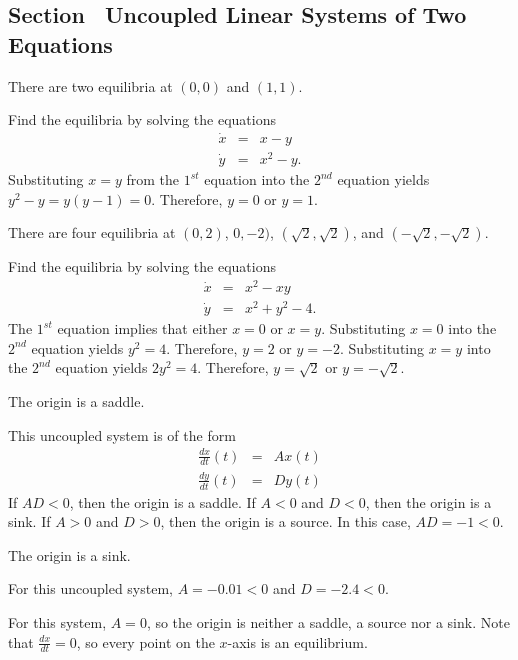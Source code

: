 \subsection*{Section~\protect{\ref{sec:UncoupledLS}} Uncoupled Linear
Systems of Two Equations}

 \ans There are two equilibria at $(0,0)$ and $(1,1)$.

\soln Find the equilibria by solving the equations
\begin{eqnarray*}
\dot{x} & = & x-y\\
\dot{y} & = & x^2-y.
\end{eqnarray*}
Substituting $x=y$ from the $1^{st}$ equation into the $2^{nd}$ equation
yields $y^2-y = y(y-1)=0$.  Therefore, $y=0$ or $y=1$.



 \ans There are four equilibria at $(0,2)$, $0,-2)$, 
$(\sqrt{2},\sqrt{2})$, and $(-\sqrt{2},-\sqrt{2})$.

\soln Find the equilibria by solving the equations
\begin{eqnarray*}
\dot{x} & = & x^2-xy\\
\dot{y} & = & x^2+y^2-4.
\end{eqnarray*}
The $1^{st}$ equation implies that either $x=0$ or $x=y$.  Substituting
$x=0$ into the $2^{nd}$ equation yields $y^2=4$.  Therefore, $y=2$ or $y=-2$.
Substituting $x=y$ into the $2^{nd}$ equation yields $2y^2=4$. Therefore, 
$y = \sqrt{2}$ or $y = -\sqrt{2}$.


\ans The origin is a saddle.

\soln This uncoupled system is of the form
\[
\begin{array}{rcl}
\frac{dx}{dt}(t) & = & Ax(t) \\
\frac{dy}{dt}(t) & = & Dy(t)\end{array}
\]
If $AD < 0$, then the origin is a saddle.  If $A < 0$ and
$D < 0$, then the origin is a sink.  If $A > 0$ and $D > 0$, then
the origin is a source.  In this case, $AD = -1 < 0$.

\ans The origin is a sink.

\soln For this uncoupled system, $A = -0.01 < 0$ and $D = -2.4 < 0$.

 For this system, $A = 0$, so the origin is neither a
saddle, a source nor a sink.  Note that $\frac{dx}{dt} = 0$, so every
point on the $x$-axis is an equilibrium.

